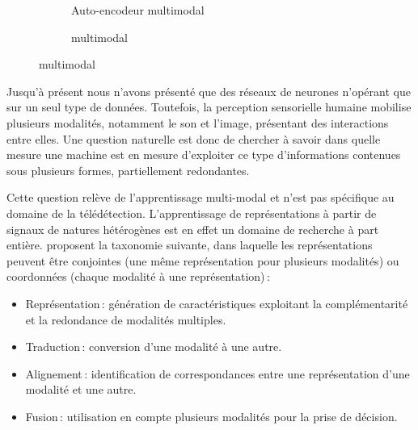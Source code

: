 \begin{figure}[h]
  \hfill
  \begin{subfigure}[b]{0.43\textwidth}
    \resizebox{\textwidth}{!}{
      
    }
    \caption{Auto-encodeur multimodal~\cite{ngiam_multimodal_2011}}
    \label{fig:ae_multimodal}
  \end{subfigure}%
  \hfill
  \begin{subfigure}[b]{0.53\textwidth}
    \resizebox{\textwidth}{!}{
      
    }
    \caption{ multimodal~\cite{eitel_multimodal_2015}}
    \label{fig:cnn_multimodal}
  \end{subfigure}
  \hfill
\end{figure}

Jusqu'à présent nous n'avons présenté que des réseaux de neurones n'opérant que sur un seul type de données. Toutefois, la perception sensorielle humaine mobilise plusieurs modalités, notamment le son et l'image, présentant des interactions entre elles. Une question naturelle est donc de chercher à savoir dans quelle mesure une machine est en mesure d'exploiter ce type d'informations contenues sous plusieurs formes, partiellement redondantes.

Cette question relève de l'apprentissage multi-modal et n'est pas spécifique au domaine de la télédétection. L'apprentissage de représentations à partir de signaux de natures hétérogènes est en effet un domaine de recherche à part entière. \citet{baltrusaitis_multimodal_2017} proposent la taxonomie suivante, dans laquelle les représentations peuvent être conjointes (une même représentation pour plusieurs modalités) ou coordonnées (chaque modalité à une représentation)\,:
\begin{itemize}
    \item Représentation\,: génération de caractéristiques exploitant la complémentarité et la redondance de modalités multiples.
    \item Traduction\,: conversion d'une modalité à une autre.
    \item Alignement\,: identification de correspondances entre une représentation d'une modalité et une autre.
    \item Fusion\,: utilisation en compte plusieurs modalités pour la prise de décision.
\end{itemize}

